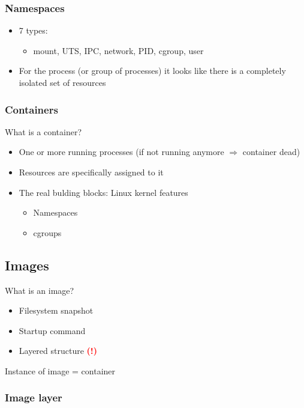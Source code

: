 \documentclass{article}
\newcommand{\bold}[1]{\textbf{#1}}
\begin{document}
\subsubsection{Namespaces}

\begin{itemize}
    \item 7 types:
    \begin{itemize}
        \item mount, UTS, IPC, network, PID, cgroup, user
    \end{itemize} 
    \item For the process (or group of processes) it looks like there is a completely isolated set of resources
\end{itemize}

\subsubsection{Containers}

What is a container?

\begin{itemize}
    \item One or more running processes (if not running anymore $\Rightarrow$ container dead)
    \item Resources are specifically assigned to it
    \item The real bulding blocks: Linux kernel features
    \begin{itemize}
        \item Namespaces
        \item cgroups
    \end{itemize}
\end{itemize}

\subsection{Images}

What is an image?

\begin{itemize}
    \item Filesystem snapshot
    \item Startup command
    \item Layered structure \bold{\textcolor{red}{(!)}}
\end{itemize}

Instance of image = container

\subsubsection{Image layer}
\end{document}
